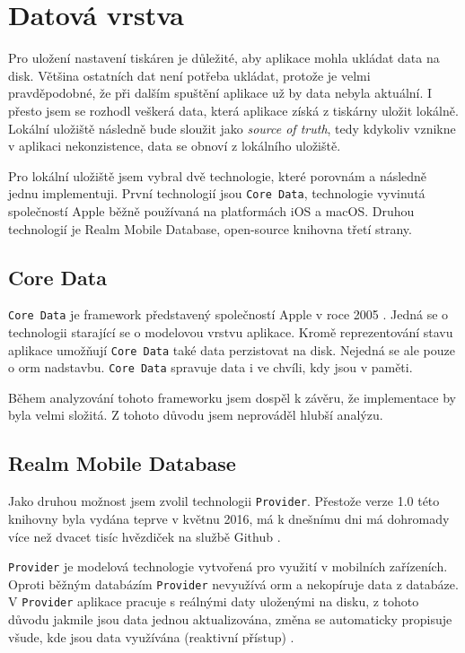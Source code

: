 \section{Datová vrstva}\label{analyza-datova-vrstva}

Pro uložení nastavení tiskáren je důležité, aby aplikace mohla ukládat data na disk.
Většina ostatních dat není potřeba ukládat, protože je velmi pravděpodobné, že při dalším spuštění aplikace už by data nebyla aktuální.
I přesto jsem se rozhodl veškerá data, která aplikace získá z tiskárny uložit lokálně.
Lokální uložiště následně bude sloužit jako \textit{source of truth}, tedy kdykoliv vznikne v aplikaci nekonzistence, data se obnoví z lokálního uložiště.

Pro lokální uložiště jsem vybral dvě technologie, které porovnám a následně jednu implementuji.
První technologií jsou \texttt{Core Data}, technologie vyvinutá společností Apple běžně používaná na platformách iOS a macOS.
Druhou technologií je Realm Mobile Database, open-source knihovna třetí strany.

\subsection{Core Data}

\texttt{Core Data} je framework představený společností Apple v roce 2005 \cite{objcio-core-data}.
Jedná se o technologii starající se o modelovou vrstvu aplikace.
Kromě reprezentování stavu aplikace umožňují \texttt{Core Data} také data perzistovat na disk.
Nejedná se ale pouze o \acrfull{orm} nadstavbu.
\texttt{Core Data} spravuje data i ve chvíli, kdy jsou v paměti.

Během analyzování tohoto frameworku jsem dospěl k závěru, že implementace by byla velmi složitá.
Z tohoto důvodu jsem neprováděl hlubší analýzu.

\subsection{Realm Mobile Database}\label{datova-vrstva-realm}

Jako druhou možnost jsem zvolil technologii \texttt{Provider}.
Přestože verze 1.0 této knihovny byla vydána teprve v květnu 2016, má k dnešnímu dni má dohromady více než dvacet tisíc hvězdiček na službě Github \cite{github-realm-repos}.

\texttt{Provider} je modelová technologie vytvořená pro využití v mobilních zařízeních.
Oproti běžným databázím \texttt{Provider} nevyužívá \acrshort{orm} a nekopíruje data z databáze.
V \texttt{Provider} aplikace pracuje s reálnými daty uloženými na disku, z tohoto důvodu jakmile jsou data jednou aktualizována, změna se automaticky propisuje všude, kde jsou data využívána (reaktivní přístup) \cite{realm-overview}.

